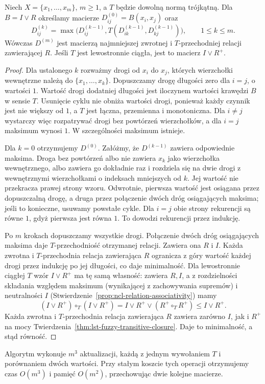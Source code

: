 \begin{twierdzenie}
\label{thm:ncl-fuzzy-warshall}
Niech $X=\{x_1,\ldots,x_m\}$, $m\geq1$,
a $T$ będzie dowolną normą trójkątną.
Dla $B=I\vee R$ określamy macierze
$D^{(0)}_{ij}=B(x_i,x_j)$ oraz
\[
 D^{(k)}_{ij}
 =\max\bigl(D^{(k-1)}_{ij},
 T(D^{(k-1)}_{ik},D^{(k-1)}_{kj})\bigr),
 \qquad 1\leq k\leq m.
\]
Wówczas $D^{(m)}$ jest macierzą najmniejszej zwrotnej
i $T$-przechodniej relacji zawierającej $R$.
Jeśli $T$ jest lewostronnie ciągła, jest to
macierz $I\vee R^+$.
\end{twierdzenie}
\begin{proof}
Dla ustalonego $k$ rozważmy drogi od $x_i$ do $x_j$,
których wierzchołki wewnętrzne należą do
$\{x_1,\ldots,x_k\}$. Dopuszczamy drogę długości zero
dla $i=j$, o wartości $1$. Wartość drogi dodatniej
długości jest iloczynem wartości krawędzi $B$
w sensie $T$. Usunięcie cyklu nie obniża wartości
drogi, ponieważ każdy czynnik jest nie większy od
$1$, a $T$ jest łączna, przemienna i monotoniczna.
Dla $i\ne j$ wystarczy więc rozpatrywać drogi
bez powtórzeń wierzchołków, a dla $i=j$ maksimum
wynosi $1$. W szczególności maksimum istnieje.

Dla $k=0$ otrzymujemy $D^{(0)}$.
Załóżmy, że $D^{(k-1)}$ zawiera odpowiednie maksima.
Droga bez powtórzeń albo nie zawiera $x_k$ jako
wierzchołka wewnętrznego, albo zawiera go dokładnie
raz i rozdziela się na dwie drogi z wewnętrznymi
wierzchołkami o indeksach mniejszych od $k$.
Jej wartość nie przekracza prawej strony wzoru.
Odwrotnie, pierwsza wartość jest osiągana przez
dopuszczalną drogę, a druga przez połączenie dwóch
dróg osiągających maksima; jeśli to konieczne,
usuwamy powstałe cykle. Dla $i=j$ obie strony
rekurencji są równe $1$, gdyż pierwsza jest równa
$1$. To dowodzi rekurencji przez indukcję.

Po $m$ krokach dopuszczamy wszystkie drogi.
Połączenie dwóch dróg osiągających maksima daje
$T$-przechodniość otrzymanej relacji. Zawiera ona
$R$ i $I$. Każda zwrotna i $T$-przechodnia relacja
zawierająca $R$ ogranicza z góry wartość każdej
drogi przez indukcję po jej długości, co daje
minimalność. Dla lewostronnie ciągłej $T$ wzór
$I\vee R^+$ ma tę samą własność: zawiera $R,I$,
a z rozdzielności składania względem maksimum
(wynikającej z zachowywania supremów) i neutralności
$I$ (Stwierdzenie~\ref{prop:ncl-relation-associativity}) mamy
\[
 (I\vee R^+)\circ_T(I\vee R^+)
 =I\vee R^+\vee(R^+\circ_T R^+)\leq I\vee R^+.
\]
Każda zwrotna i $T$-przechodnia relacja zawierająca
$R$ zawiera zarówno $I$, jak i $R^+$ na mocy
Twierdzenia~\ref{thm:lst-fuzzy-transitive-closure}.
Daje to minimalność, a stąd równość.
\end{proof}
Algorytm wykonuje $m^3$ aktualizacji, każdą z jednym
wywołaniem $T$ i porównaniem dwóch wartości.
Przy stałym koszcie tych operacji otrzymujemy czas
$O(m^3)$ i pamięć $O(m^2)$, przechowując dwie
kolejne macierze.

